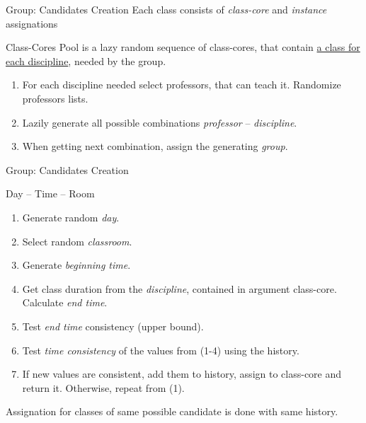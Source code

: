 \documentclass{beamer}
\begin{document}
\begin{frame}{Group: Candidates Creation}
  \centering
  Each class consists of \emph{class-core} and \emph{instance} assignations

  \bigskip \bigskip

  \begin{block}{Class-Cores Pool}
    is a lazy random sequence of class-cores,
    that contain \underline{a class for each discipline}, needed by the group.

    \medskip

    \begin{enumerate}
      \item For each discipline needed select professors, that can teach it.
            Randomize professors lists.
      \item Lazily generate all possible combinations \emph{professor} -- \emph{discipline}.
      \item When getting next combination, assign the generating \emph{group}.
    \end{enumerate}
  \end{block}
\end{frame}

\begin{frame}{Group: Candidates Creation}
  \begin{block}{Day -- Time -- Room}
    \begin{enumerate}
      \item Generate random \emph{day}.
      \item Select random \emph{classroom}.
      \item Generate \emph{beginning time}.
      \item Get class duration from the \emph{discipline}, contained in argument class-core.
            Calculate \emph{end time}.
      \item Test \emph{end time} consistency (upper bound).
      \item Test \emph{time consistency} of the values from (1-4) using the history.
      \item If new values are consistent, add them to history, assign to class-core
            and return it.
            Otherwise, repeat from (1).
    \end{enumerate}
    Assignation for classes of same possible candidate is done with same
      history.
  \end{block}
\end{frame}


\end{document}
